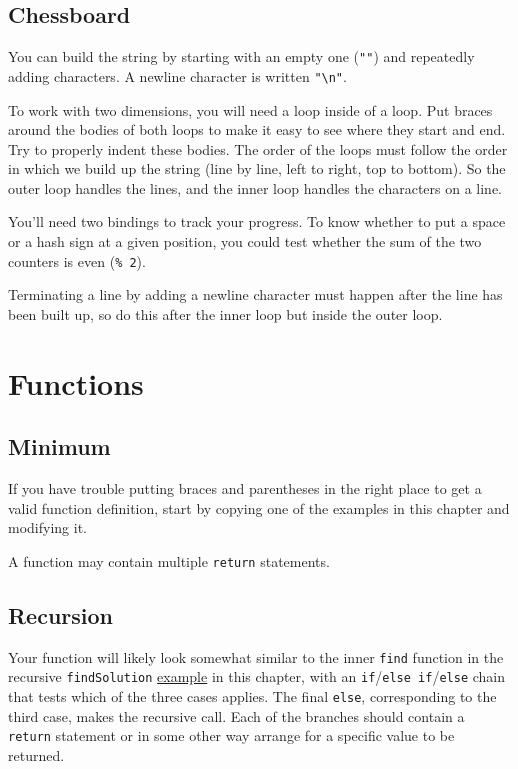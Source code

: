 \subsection{Chessboard}

You can build the string by starting with an empty one (\lstinline`""`) and repeatedly adding characters. A newline character is written \lstinline`"\n"`.

To work with two dimensions, you will need a loop inside of a loop. Put braces around the bodies of both loops to make it easy to see where they start and end. Try to properly indent these bodies. The order of the loops must follow the order in which we build up the string (line by line, left to right, top to bottom). So the outer loop handles the lines, and the inner loop handles the characters on a line.

You'll need two bindings to track your progress. To know whether to put a space or a hash sign at a given position, you could test whether the sum of the two counters is even (\lstinline`% 2`).

Terminating a line by adding a newline character must happen after the line has been built up, so do this after the inner loop but inside the outer loop.

\section{Functions}

\subsection{Minimum}

If you have trouble putting braces and parentheses in the right place to get a valid function definition, start by copying one of the examples in this chapter and modifying it.

A function may contain multiple \lstinline`return` statements.

\subsection{Recursion}

Your function will likely look somewhat similar to the inner \lstinline`find` function in the recursive \lstinline`findSolution` \hyperref[functions.recursive_puzzle]{example} in this chapter, with an \lstinline`if`/\lstinline`else if`/\lstinline`else` chain that tests which of the three cases applies. The final \lstinline`else`, corresponding to the third case, makes the recursive call. Each of the branches should contain a \lstinline`return` statement or in some other way arrange for a specific value to be returned.

